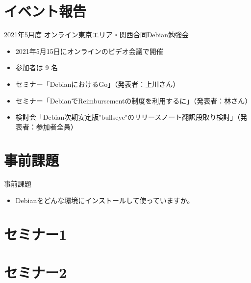 \section{イベント報告}

\begin{frame}{2021年5月度 オンライン東京エリア・関西合同Debian勉強会}
\begin{itemize}
\item 2021年5月15日にオンラインのビデオ会議で開催
\item 参加者は 9 名
\item セミナー「DebianにおけるGo」（発表者：上川さん）
\item セミナー「DebianでReimbursementの制度を利用するに」（発表者：林さん）
\item 検討会「Debian次期安定版"bullseye"のリリースノート翻訳段取り検討」（発表者：参加者全員）
\end{itemize}
\end{frame}


\section{事前課題}


\begin{frame}{事前課題}
  \begin{itemize}
   \item Debianをどんな環境にインストールして使っていますか。
  \end{itemize}
\end{frame}

{\footnotesize
  
}

%

\section{セミナー1}

\section{セミナー2}

